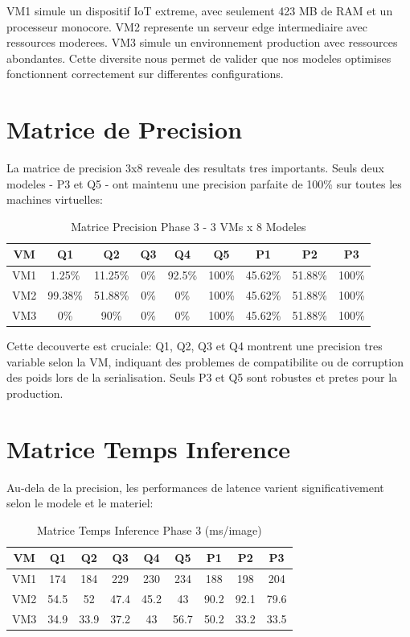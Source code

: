 \documentclass[12pt,a4paper]{report}
\begin{document}
VM1 simule un dispositif IoT extreme, avec seulement 423 MB de RAM et un processeur monocore. VM2 represente un serveur edge intermediaire avec ressources moderees. VM3 simule un environnement production avec ressources abondantes. Cette diversite nous permet de valider que nos modeles optimises fonctionnent correctement sur differentes configurations.

\section{Matrice de Precision}

La matrice de precision 3x8 reveale des resultats tres importants. Seuls deux modeles - P3 et Q5 - ont maintenu une precision parfaite de 100\% sur toutes les machines virtuelles:

\begin{table}[H]
\centering
\small
\begin{tabular}{|c|c|c|c|c|c|c|c|c|}
\hline
\textbf{VM} & Q1 & Q2 & Q3 & Q4 & Q5 & P1 & P2 & P3 \\
\hline
VM1 & 1.25\% & 11.25\% & 0\% & 92.5\% & \cellcolor{lightblue}100\% & 45.62\% & 51.88\% & 100\% \\
VM2 & 99.38\% & 51.88\% & 0\% & 0\% & \cellcolor{lightblue}100\% & 45.62\% & 51.88\% & 100\% \\
VM3 & 0\% & 90\% & 0\% & 0\% & \cellcolor{lightblue}100\% & 45.62\% & 51.88\% & 100\% \\
\hline
\end{tabular}
\caption{Matrice Precision Phase 3 - 3 VMs x 8 Modeles}
\end{table}

Cette decouverte est cruciale: Q1, Q2, Q3 et Q4 montrent une precision tres variable selon la VM, indiquant des problemes de compatibilite ou de corruption des poids lors de la serialisation. Seuls P3 et Q5 sont robustes et pretes pour la production.

\section{Matrice Temps Inference}

Au-dela de la precision, les performances de latence varient significativement selon le modele et le materiel:

\begin{table}[H]
\centering
\small
\begin{tabular}{|c|c|c|c|c|c|c|c|c|}
\hline
\textbf{VM} & Q1 & Q2 & Q3 & Q4 & Q5 & P1 & P2 & P3 \\
\hline
VM1 & 174 & 184 & 229 & 230 & 234 & 188 & 198 & 204 \\
VM2 & 54.5 & 52 & 47.4 & 45.2 & \cellcolor{lightblue}43 & 90.2 & 92.1 & 79.6 \\
VM3 & 34.9 & 33.9 & 37.2 & 43 & 56.7 & 50.2 & 33.2 & \cellcolor{lightblue}33.5 \\
\hline
\end{tabular}
\caption{Matrice Temps Inference Phase 3 (ms/image)}
\end{table}
\end{document}
